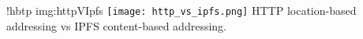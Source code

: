 \namedfigure
{!hbtp}
{img:httpVIpfs}
{\texttt{[image: http\_vs\_ipfs.png]}}
{HTTP location-based addressing vs IPFS content-based addressing.}
